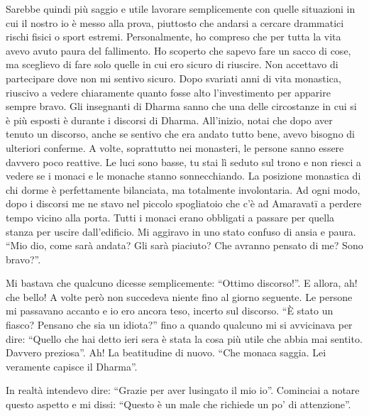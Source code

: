 Sarebbe quindi più saggio e utile lavorare semplicemente con quelle situazioni in cui il nostro io è messo alla prova, piuttosto che andarsi a cercare drammatici rischi fisici o sport estremi. Personalmente, ho compreso che per tutta la vita avevo avuto paura del fallimento. Ho scoperto che sapevo fare un sacco di cose, ma sceglievo di fare solo quelle in cui ero sicuro di riuscire. Non accettavo di partecipare dove non mi sentivo sicuro. Dopo svariati anni di vita monastica, riuscivo a vedere chiaramente quanto fosse alto l'investimento per apparire sempre bravo. Gli insegnanti di Dharma sanno che una delle circostanze in cui si è più esposti è durante i discorsi di Dharma. All'inizio, notai che dopo aver tenuto un discorso, anche se sentivo che era andato tutto bene, avevo bisogno di ulteriori conferme. A volte, soprattutto nei monasteri, le persone sanno essere davvero poco reattive. Le luci sono basse, tu stai lì seduto sul trono e non riesci a vedere se i monaci e le monache stanno sonnecchiando. La posizione monastica di chi dorme è perfettamente bilanciata, ma totalmente involontaria. Ad ogni modo, dopo i discorsi me ne stavo nel piccolo spogliatoio che c'è ad Amaravatī a perdere tempo vicino alla porta. Tutti i monaci erano obbligati a passare per quella stanza per uscire dall'edificio. Mi aggiravo in uno stato confuso di ansia e paura. ``Mio dio, come sarà andata? Gli sarà piaciuto? Che avranno pensato di me? Sono bravo?''.

Mi bastava che qualcuno dicesse semplicemente: ``Ottimo discorso!''. E allora, ah! che bello! A volte però non succedeva niente fino al giorno seguente. Le persone mi passavano accanto e io ero ancora teso, incerto sul discorso. ``È stato un fiasco? Pensano che sia un idiota?'' fino a quando qualcuno mi si avvicinava per dire: ``Quello che hai detto ieri sera è stata la cosa più utile che abbia mai sentito. Davvero preziosa''. Ah! La beatitudine di nuovo. ``Che monaca saggia. Lei veramente capisce il Dharma''.

In realtà intendevo dire: ``Grazie per aver lusingato il mio io''. Cominciai a notare questo aspetto e mi dissi: ``Questo è un male che richiede un po' di attenzione''.


